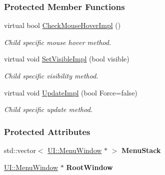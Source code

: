 \subsubsection*{Protected Member Functions}
\begin{DoxyCompactItemize}
\item 
\hypertarget{classMezzanine_1_1UI_1_1Menu_a94054405f504ec8609cd5e0d17b0dc77}{
virtual bool \hyperlink{classMezzanine_1_1UI_1_1Menu_a94054405f504ec8609cd5e0d17b0dc77}{CheckMouseHoverImpl} ()}
\label{classMezzanine_1_1UI_1_1Menu_a94054405f504ec8609cd5e0d17b0dc77}

\begin{DoxyCompactList}\small\item\em Child specific mouse hover method. \item\end{DoxyCompactList}\item 
\hypertarget{classMezzanine_1_1UI_1_1Menu_ac588517c84605052c85f5bd61400bca5}{
virtual void \hyperlink{classMezzanine_1_1UI_1_1Menu_ac588517c84605052c85f5bd61400bca5}{SetVisibleImpl} (bool visible)}
\label{classMezzanine_1_1UI_1_1Menu_ac588517c84605052c85f5bd61400bca5}

\begin{DoxyCompactList}\small\item\em Child specific visibility method. \item\end{DoxyCompactList}\item 
\hypertarget{classMezzanine_1_1UI_1_1Menu_a2b39609d1f6ec42de803f0eb34113004}{
virtual void \hyperlink{classMezzanine_1_1UI_1_1Menu_a2b39609d1f6ec42de803f0eb34113004}{UpdateImpl} (bool Force=false)}
\label{classMezzanine_1_1UI_1_1Menu_a2b39609d1f6ec42de803f0eb34113004}

\begin{DoxyCompactList}\small\item\em Child specific update method. \item\end{DoxyCompactList}\end{DoxyCompactItemize}
\subsubsection*{Protected Attributes}
\begin{DoxyCompactItemize}
\item 
\hypertarget{classMezzanine_1_1UI_1_1Menu_a1b1e88f230b44863d6f409ede91e7736}{
std::vector$<$ \hyperlink{classMezzanine_1_1UI_1_1MenuWindow}{UI::MenuWindow} $\ast$ $>$ {\bfseries MenuStack}}
\label{classMezzanine_1_1UI_1_1Menu_a1b1e88f230b44863d6f409ede91e7736}

\item 
\hypertarget{classMezzanine_1_1UI_1_1Menu_abe93e13c3c385488a459dde368a4ce5e}{
\hyperlink{classMezzanine_1_1UI_1_1MenuWindow}{UI::MenuWindow} $\ast$ {\bfseries RootWindow}}
\label{classMezzanine_1_1UI_1_1Menu_abe93e13c3c385488a459dde368a4ce5e}

\end{DoxyCompactItemize}



